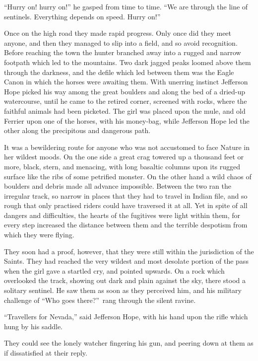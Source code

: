 \documentclass[12pt,english]{book}
\begin{document}
{}``Hurry on! hurry on!'' he gasped from time to time. {}``We are
through the line of sentinels. Everything depends on speed. Hurry
on!''

Once on the high road they made rapid progress. Only once did they
meet anyone, and then they managed to slip into a field, and so avoid
recognition. Before reaching the town the hunter branched away into
a rugged and narrow footpath which led to the mountains. Two dark
jagged peaks loomed above them through the darkness, and the defile
which led between them was the Eagle Canon in which the horses were
awaiting them. With unerring instinct Jefferson Hope picked his way
among the great boulders and along the bed of a dried-up watercourse,
until he came to the retired corner, screened with rocks, where the
faithful animals had been picketed. The girl was placed upon the mule,
and old Ferrier upon one of the horses, with his money-bag, while
Jefferson Hope led the other along the precipitous and dangerous path.

It was a bewildering route for anyone who was not accustomed to face
Nature in her wildest moods. On the one side a great crag towered
up a thousand feet or more, black, stern, and menacing, with long
basaltic columns upon its rugged surface like the ribs of some petrified
monster. On the other hand a wild chaos of boulders and debris made
all advance impossible. Between the two ran the irregular track, so
narrow in places that they had to travel in Indian file, and so rough
that only practised riders could have traversed it at all. Yet in
spite of all dangers and difficulties, the hearts of the fugitives
were light within them, for every step increased the distance between
them and the terrible despotism from which they were flying.

They soon had a proof, however, that they were still within the jurisdiction
of the Saints. They had reached the very wildest and most desolate
portion of the pass when the girl gave a startled cry, and pointed
upwards. On a rock which overlooked the track, showing out dark and
plain against the sky, there stood a solitary sentinel. He saw them
as soon as they perceived him, and his military challenge of {}``Who
goes there?''\ rang through the silent ravine.

{}``Travellers for Nevada,'' said Jefferson Hope, with his hand
upon the rifle which hung by his saddle.

They could see the lonely watcher fingering his gun, and peering down
at them as if dissatisfied at their reply.
\end{document}
